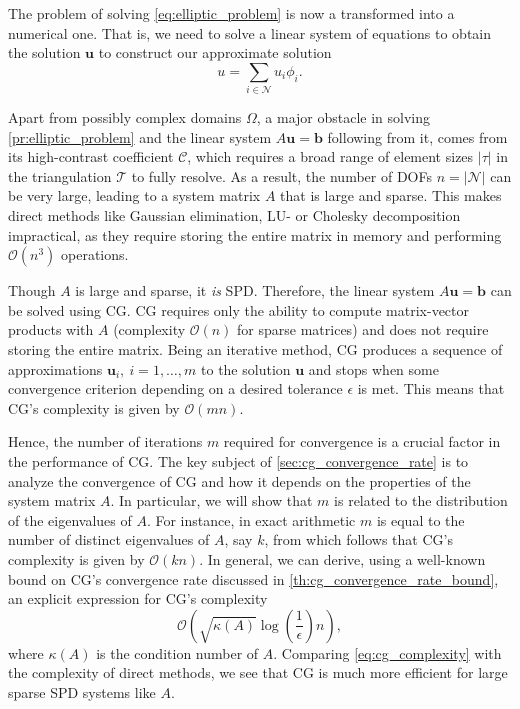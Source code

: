 The problem of solving \cref{eq:elliptic_problem} is now a transformed into a numerical one. That is, we need to solve a linear system of equations to obtain the solution $\mathbf{u}$ to construct our approximate solution
\begin{equation*}
  u = \sum_{i\in\mathcal{N}} u_i \phi_i.
\end{equation*}

Apart from possibly complex domains $\Omega$, a major obstacle in solving \cref{pr:elliptic_problem} and the linear system $A\mathbf{u} = \mathbf{b}$ following from it, comes from its high-contrast coefficient $\mathcal{C}$, which requires a broad range of element sizes $|\tau|$ in the triangulation $\mathcal{T}$ to fully resolve. As a result, the number of DOFs $n = |\mathcal{N}|$ can be very large, leading to a system matrix $A$ that is large and sparse. This makes direct methods like Gaussian elimination, LU- or Cholesky decomposition impractical, as they require storing the entire matrix in memory and performing $\mathcal{O}(n^3)$ operations. 

Though $A$ is large and sparse, it \textit{is} SPD. Therefore, the linear system $A\mathbf{u} = \mathbf{b}$ can be solved using CG. CG requires only the ability to compute matrix-vector products with $A$ (complexity $\mathcal{O}(n)$ for sparse matrices) and does not require storing the entire matrix. Being an iterative method, CG produces a sequence of approximations $\mathbf{u}_i, \ i = 1,\dots,m$ to the solution $\mathbf{u}$ and stops when some convergence criterion depending on a desired tolerance $\epsilon$ is met. This means that CG's complexity is given by $\mathcal{O}(mn)$. 

Hence, the number of iterations $m$ required for convergence is a crucial factor in the performance of CG. The key subject of \cref{sec:cg_convergence_rate} is to analyze the convergence of CG and how it depends on the properties of the system matrix $A$. In particular, we will show that $m$ is related to the distribution of the eigenvalues of $A$. For instance, in exact arithmetic $m$ is equal to the number of distinct eigenvalues of $A$, say $k$, from which follows that CG's complexity is given by $\mathcal{O}(k n)$. In general, we can derive, using a well-known bound on CG's convergence rate discussed in \cref{th:cg_convergence_rate_bound}, an explicit expression for CG's complexity 
\begin{equation}
  \mathcal{O}\left(\sqrt{\kappa(A)}\log\left(\frac{1}{\epsilon}\right)n\right),
  \label{eq:cg_complexity}
\end{equation}
where $\kappa(A)$ is the condition number of $A$. Comparing \cref{eq:cg_complexity} with the complexity of direct methods, we see that CG is much more efficient for large sparse SPD systems like $A$. 

